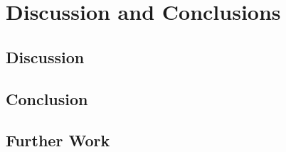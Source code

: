 
\chapter{Discussion and Conclusions}

\section{Discussion}

\section{Conclusion}

\section{Further Work}
